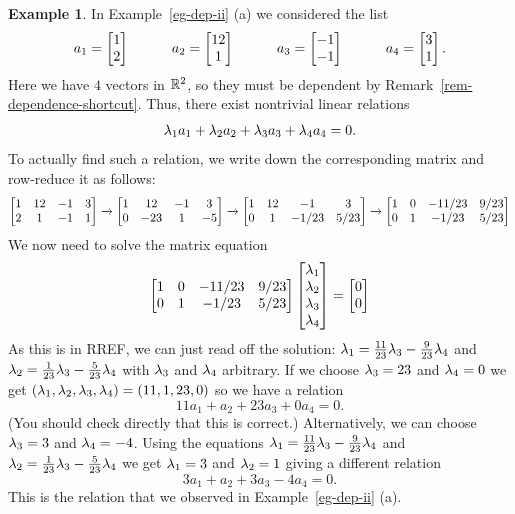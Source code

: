 \documentclass[reqno]{amsart}
\theoremstyle{definition}
\newtheorem{example}[theorem]{Example}
\begin{document}
\begin{example}\label{eg-dep-ii-matrix}
 In Example~\ref{eg-dep-ii} (a) we considered the list
 \[ a_1 = \left[\begin{matrix}  1 \\  2 \end{matrix}\right] \hspace{3em}
    a_2 = \left[\begin{matrix} 12 \\  1 \end{matrix}\right] \hspace{3em}
    a_3 = \left[\begin{matrix} -1 \\ -1 \end{matrix}\right] \hspace{3em}
    a_4 = \left[\begin{matrix}  3 \\  1 \end{matrix}\right].
 \]
 Here we have $4$ vectors in ${\mathbb{R}}^2$, so they must be dependent by
 Remark~\ref{rem-dependence-shortcut}.  Thus, there exist nontrivial
 linear relations
 \[ \lambda_1a_1 + \lambda_2a_2 + \lambda_3a_3 + \lambda_4a_4 = 0. \]
 To actually find such a relation, we write down the corresponding
 matrix and row-reduce it as follows:
 \[
  \left[\begin{matrix}
   1 & 12 & -1 & 3 \\
   2 & 1  & -1 & 1
  \end{matrix}\right]
  \xrightarrow{}
  \left[\begin{matrix}
   1 &  12 & -1 & 3 \\
   0 & -23 &  1 & -5
  \end{matrix}\right]
  \xrightarrow{}
  \left[\begin{matrix}
   1 &  12 & -1 & 3 \\
   0 &  1 & -1/23 & 5/23
  \end{matrix}\right]
  \xrightarrow{}
  \left[\begin{matrix}
   1 &  0 & -11/23 & 9/23 \\
   0 &  1 & -1/23 & 5/23
  \end{matrix}\right]
 \]
 We now need to solve the matrix equation
 \[ \left[\begin{matrix}
     1 &  0 & -11/23 & 9/23 \\
     0 &  1 & -1/23 & 5/23
    \end{matrix}\right]
    \left[\begin{matrix} \lambda_1 \\ \lambda_2 \\ \lambda_3 \\ \lambda_4 \end{matrix}\right] =
    \left[\begin{matrix} 0 \\ 0 \end{matrix}\right]
 \]
 As this is in RREF, we can just read off the solution:
 $\lambda_1=\frac{11}{23}\lambda_3-\frac{9}{23}\lambda_4$ and
 $\lambda_2=\frac{1}{23}\lambda_3-\frac{5}{23}\lambda_4$
 with $\lambda_3$ and $\lambda_4$ arbitrary.  If we choose $\lambda_3=23$ and
 $\lambda_4=0$ we get $(\lambda_1,\lambda_2,\lambda_3,\lambda_4)=(11,1,23,0)$ so we have a
 relation
 \[ 11 a_1 + a_2 + 23 a_3 + 0 a_4 = 0. \]
 (You should check directly that this is correct.)  Alternatively, we
 can choose $\lambda_3=3$ and $\lambda_4=-4$.  Using the equations
 $\lambda_1=\frac{11}{23}\lambda_3-\frac{9}{23}\lambda_4$ and
 $\lambda_2=\frac{1}{23}\lambda_3-\frac{5}{23}\lambda_4$ we get $\lambda_1=3$ and
 $\lambda_2=1$ giving a different relation
 \[ 3a_1 + a_2 + 3a_3 - 4a_4 = 0. \]
 This is the relation that we observed in Example~\ref{eg-dep-ii} (a).
\end{example}
\end{document}
